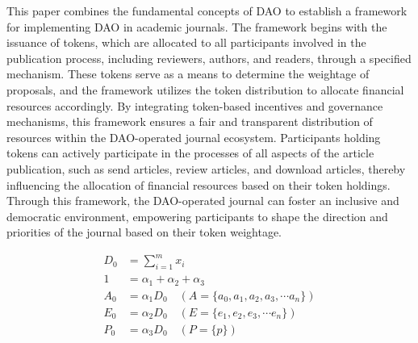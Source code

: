 \documentclass[lettersize,journal]{IEEEtran}
\begin{document}



This paper combines the fundamental concepts of DAO to establish a framework for implementing DAO in academic journals. The framework begins with the issuance of tokens, which are allocated to all participants involved in the publication process, including reviewers, authors, and readers, through a specified mechanism. These tokens serve as a means to determine the weightage of proposals, and the framework utilizes the token distribution to allocate financial resources accordingly. By integrating token-based incentives and governance mechanisms, this framework ensures a fair and transparent distribution of resources within the DAO-operated journal ecosystem. Participants holding tokens can actively participate in the processes of all aspects of the article publication, such as send articles, review articles, and download articles, thereby influencing the allocation of financial resources based on their token holdings. Through this framework, the DAO-operated journal can foster an inclusive and democratic environment, empowering participants to shape the direction and priorities of the journal based on their token weightage.

\begin{equation}
  \begin{aligned}
    D_0 &= \sum_{i = 1}^{m}x_i \\
    1 &= \alpha_1 + \alpha_2 + \alpha_3 \\
    A_0 &= \alpha_1 D_0 \quad (A=\{a_0, a_1, a_2, a_3, \cdots a_n\}) \\
    E_0 &= \alpha_2 D_0 \quad (E=\{e_1, e_2, e_3, \cdots e_n\}) \\
    P_0 &= \alpha_3 D_0 \quad (P=\{p\})
  \end{aligned}
  \label{eq:dao0}
\end{equation}
\end{document}
